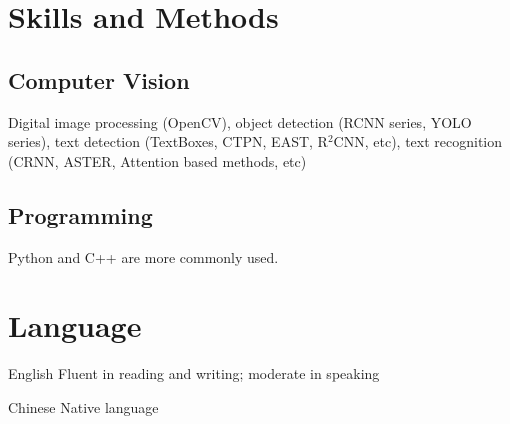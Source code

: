 \documentclass[12pt,letterpaper]{report}
\newcommand{\listitemspace}{0.15em}%
\newenvironment{desp}
{\begin{list}{}{\setlength{\leftmargin}{0em}
			\setlength{\parskip}{0em}
			\setlength{\itemsep}{\listitemspace}
			\setlength{\parsep}{\listitemspace}}}
	{\end{list}}
\begin{document}
	\section*{Skills and Methods}

	 \subsection*{Computer Vision}
	   \begin{desp}
	     \item Digital image processing (OpenCV), object detection (RCNN series, YOLO series), text detection (TextBoxes, CTPN, EAST, R$^2$CNN, etc), text recognition (CRNN, ASTER, Attention based methods, etc)
	   \end{desp}
	 \subsection*{Programming}
	   \begin{desp}
       \item Python and C++ are more commonly used.
	   \end{desp}

  \section*{Language}

  \begin{tablist}
    \item[English] \tab Fluent in reading and writing; moderate in speaking
		\item[Chinese] \tab Native language
	\end{tablist}

	\begin{center}
		\vspace{6em}
	\end{center}
\end{document}
